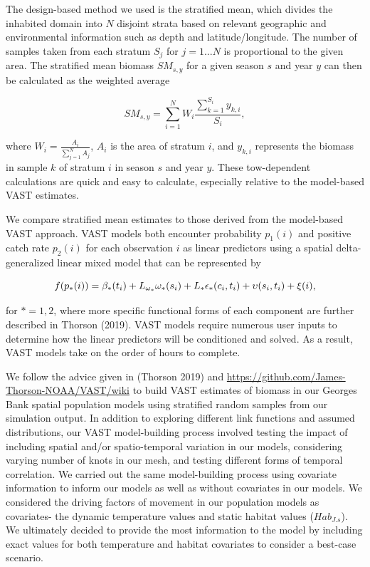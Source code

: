 \documentclass[
  12pt,
]{article}
\begin{document}
The design-based method we used is the stratified mean, which divides the inhabited domain into \(N\) disjoint strata based on relevant geographic and environmental information such as depth and latitude/longitude. The number of samples taken from each stratum \(S_j\) for \(j=1...N\) is proportional to the given area. The stratified mean biomass \(SM_{s,y}\) for a given season \(s\) and year \(y\) can then be calculated as the weighted average

\begin{equation*}
 SM_{s,y} = \sum_{i=1}^N W_i \frac{\sum_{k=1}^{S_i}y_{k,i}}{S_i},
\end{equation*}

where \(W_i=\frac{A_i}{\sum_{j=1}^N A_j}\), \(A_i\) is the area of stratum \(i\), and \(y_{k,i}\) represents the biomass in sample \(k\) of stratum \(i\) in season \(s\) and year \(y\). These tow-dependent calculations are quick and easy to calculate, especially relative to the model-based VAST estimates.

We compare stratified mean estimates to those derived from the model-based VAST approach. VAST models both encounter probability \(p_1(i)\) and positive catch rate \(p_2(i)\) for each observation \(i\) as linear predictors using a spatial delta-generalized linear mixed model that can be represented by

\[
  \makebox[\linewidth]{$f(p_*(i))= \beta_*(t_i) + L_{\omega_*}\omega_*(s_i) + L_* \epsilon_*(c_i,t_i) + \upsilon(s_i,t_i) + \xi(i),$}
\]

for \(*=1,2\), where more specific functional forms of each component are further described in Thorson (2019). VAST models require numerous user inputs to determine how the linear predictors will be conditioned and solved. As a result, VAST models take on the order of hours to complete.

We follow the advice given in (Thorson 2019) and \url{https://github.com/James-Thorson-NOAA/VAST/wiki} to build VAST estimates of biomass in our Georges Bank spatial population models using stratified random samples from our simulation output. In addition to exploring different link functions and assumed distributions, our VAST model-building process involved testing the impact of including spatial and/or spatio-temporal variation in our models, considering varying number of knots in our mesh, and testing different forms of temporal correlation. We carried out the same model-building process using covariate information to inform our models as well as without covariates in our models. We considered the driving factors of movement in our population models as covariates- the dynamic temperature values and static habitat values (\(Hab_{J.s}\)). We ultimately decided to provide the most information to the model by including exact values for both temperature and habitat covariates to consider a best-case scenario.
\end{document}
